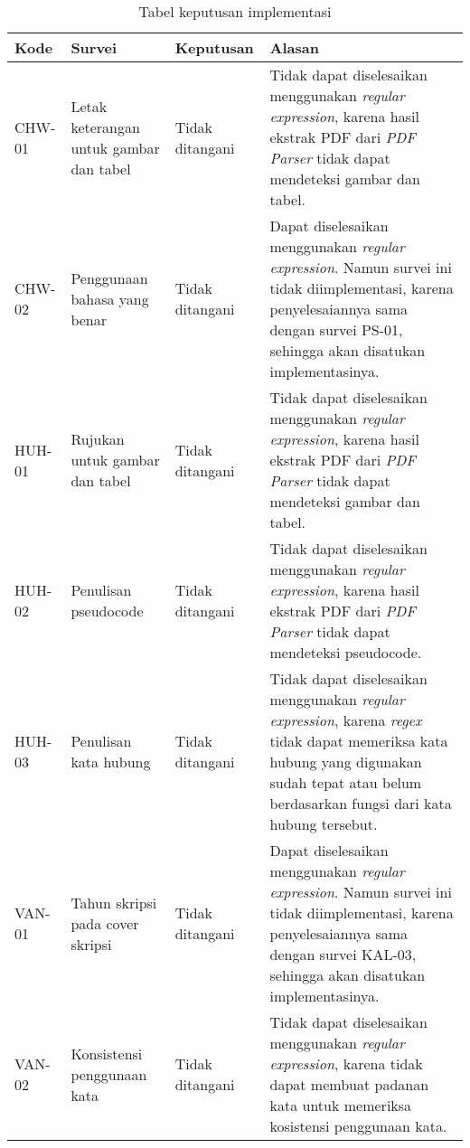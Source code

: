 \begin{table}[H]
	\renewcommand{\arraystretch}{1.5}
	\caption {Tabel keputusan implementasi} \label{tab:keputusan3}
	\begin{center}
		\begin{tabular}{|p{1.5 cm}|>{\raggedright} p{4.3 cm}| p{2.2 cm}| p{6.5 cm}|}
		\hline
		Kode & Survei & Keputusan & Alasan \\ 
		\hline 
		CHW-01 & Letak keterangan untuk gambar dan tabel & Tidak \newline ditangani & Tidak dapat diselesaikan menggunakan \textit{regular expression}, karena hasil ekstrak PDF dari \textit{PDF Parser} tidak dapat mendeteksi gambar dan tabel.\newline \\ 
		\hline 
		CHW-02 & Penggunaan bahasa yang benar & Tidak \newline ditangani & Dapat diselesaikan menggunakan \textit{regular expression}. Namun survei ini tidak diimplementasi, karena penyelesaiannya sama dengan survei PS-01, sehingga akan disatukan implementasinya. \newline \\		
		\hline
		HUH-01 & Rujukan untuk gambar dan tabel & Tidak \newline ditangani & Tidak dapat diselesaikan menggunakan \textit{regular expression}, karena hasil ekstrak PDF dari \textit{PDF Parser} tidak dapat mendeteksi gambar dan tabel. \newline \\ 
		\hline 
		HUH-02 & Penulisan pseudocode & Tidak \newline ditangani & Tidak dapat diselesaikan menggunakan \textit{regular expression}, karena hasil ekstrak PDF dari \textit{PDF Parser} tidak dapat mendeteksi pseudocode. \newline \\ 
		\hline 
		HUH-03 & Penulisan kata hubung & Tidak \newline ditangani & Tidak dapat diselesaikan menggunakan \textit{regular expression}, karena \textit{regex} tidak dapat memeriksa kata hubung yang digunakan sudah tepat atau belum berdasarkan fungsi dari kata hubung tersebut. \newline \\ 
		\hline 
		VAN-01 & Tahun skripsi pada cover skripsi & Tidak \newline ditangani & Dapat diselesaikan menggunakan \textit{regular expression}. Namun survei ini tidak diimplementasi, karena penyelesaiannya sama dengan survei KAL-03, sehingga
akan disatukan implementasinya. \newline \\ 
		\hline 
		VAN-02 & Konsistensi penggunaan kata & Tidak \newline ditangani & Tidak dapat diselesaikan menggunakan \textit{regular expression}, karena tidak dapat membuat padanan kata untuk memeriksa kosistensi penggunaan kata. \newline \\ 
		\hline
		\end{tabular}
	\end{center}
\end{table}

